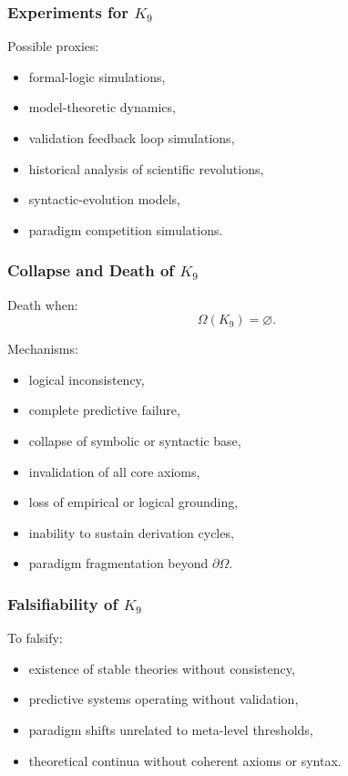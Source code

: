 \subsubsection{Experiments for \texorpdfstring{$K_9$}{K_9}}

Possible proxies:
\begin{itemize}
    \item formal-logic simulations,
    \item model-theoretic dynamics,
    \item validation feedback loop simulations,
    \item historical analysis of scientific revolutions,
    \item syntactic-evolution models,
    \item paradigm competition simulations.
\end{itemize}

\subsubsection{Collapse and Death of \texorpdfstring{$K_9$}{K_9}}

Death when:
\[
\Omega(K_9)=\varnothing.
\]

Mechanisms:
\begin{itemize}
    \item logical inconsistency,
    \item complete predictive failure,
    \item collapse of symbolic or syntactic base,
    \item invalidation of all core axioms,
    \item loss of empirical or logical grounding,
    \item inability to sustain derivation cycles,
    \item paradigm fragmentation beyond $\partial\Omega$.
\end{itemize}

\subsubsection{Falsifiability of \texorpdfstring{$K_9$}{K_9}}

To falsify:
\begin{itemize}
    \item existence of stable theories without consistency,
    \item predictive systems operating without validation,
    \item paradigm shifts unrelated to meta-level thresholds,
    \item theoretical continua without coherent axioms or syntax.
\end{itemize}

